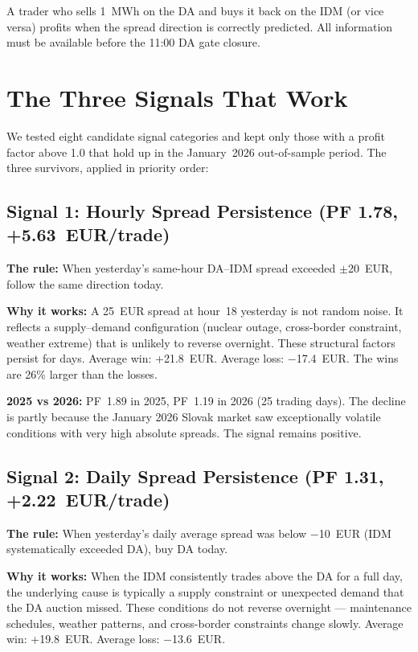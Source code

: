 \documentclass[11pt,a4paper]{article}
\begin{document}
A trader who sells 1~MWh on the DA and buys it back on the IDM (or vice versa) profits when the spread direction is correctly predicted. All information must be available before the 11:00 DA gate closure.

\section{The Three Signals That Work}

We tested eight candidate signal categories and kept only those with a profit factor above 1.0 that hold up in the January~2026 out-of-sample period. The three survivors, applied in priority order:

\subsection{Signal 1: Hourly Spread Persistence (PF 1.78, +5.63~EUR/trade)}

\textbf{The rule:} When yesterday's same-hour DA--IDM spread exceeded $\pm$20~EUR, follow the same direction today.

\textbf{Why it works:} A 25~EUR spread at hour~18 yesterday is not random noise. It reflects a supply--demand configuration (nuclear outage, cross-border constraint, weather extreme) that is unlikely to reverse overnight. These structural factors persist for days. Average win: +21.8~EUR. Average loss: $-$17.4~EUR. The wins are 26\% larger than the losses.

\textbf{2025 vs 2026:} PF~1.89 in 2025, PF~1.19 in 2026 (25 trading days). The decline is partly because the January 2026 Slovak market saw exceptionally volatile conditions with very high absolute spreads. The signal remains positive.

\subsection{Signal 2: Daily Spread Persistence (PF 1.31, +2.22~EUR/trade)}

\textbf{The rule:} When yesterday's daily average spread was below $-$10~EUR (IDM systematically exceeded DA), buy DA today.

\textbf{Why it works:} When the IDM consistently trades above the DA for a full day, the underlying cause is typically a supply constraint or unexpected demand that the DA auction missed. These conditions do not reverse overnight --- maintenance schedules, weather patterns, and cross-border constraints change slowly. Average win: +19.8~EUR. Average loss: $-$13.6~EUR.
\end{document}
